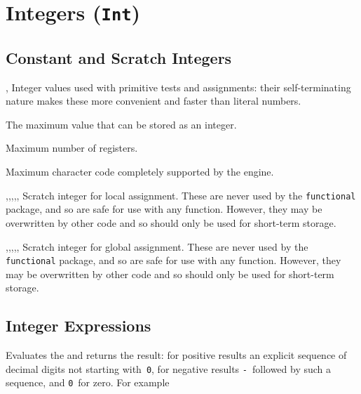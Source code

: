 \documentclass[oneside]{book}
\begin{document}
\chapter{Integers (\texttt{Int})}

\section{Constant and Scratch Integers}

\begin{variable}{\cZeroInt,\cOneInt}
Integer values used with primitive tests and assignments: their
self-terminating nature makes these more convenient and faster than
literal numbers.
\end{variable}

\begin{variable}{\cMaxInt}
The maximum value that can be stored as an integer.
\end{variable}

\begin{variable}{\cMaxRegisterInt}
Maximum number of registers.
\end{variable}

\begin{variable}{\cMaxCharInt}
Maximum character code completely supported by the engine.
\end{variable}

\begin{variable}{\lTmpaInt,\lTmpbInt,\lTmpcInt,\lTmpiInt,\lTmpjInt,\lTmpkInt}
Scratch integer for local assignment. These are never used by
the \verb!functional! package, and so are safe for use with any
function. However, they may be overwritten by other
code and so should only be used for short-term storage.
\end{variable}

\begin{variable}{\gTmpaInt,\gTmpbInt,\gTmpcInt,\gTmpiInt,\gTmpjInt,\gTmpkInt}
Scratch integer for global assignment. These are never used by
the \verb!functional! package, and so are safe for use with any
function. However, they may be overwritten by other
code and so should only be used for short-term storage.
\end{variable}

\section{Integer Expressions}

\begin{function}{\IntEval}
\begin{syntax}
 
\end{syntax}
Evaluates the  and returns the result:
for positive results an
explicit sequence of decimal digits not starting with~\texttt{0},
for negative results \texttt{-}~followed by such a sequence, and
\texttt{0}~for zero. For example
\begin{demohigh}
\end{demohigh}
\end{function}
\end{document}
